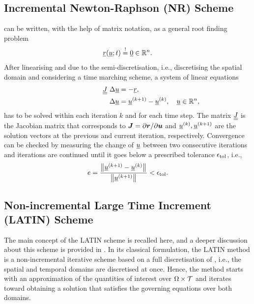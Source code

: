 \subsection{Incremental Newton-Raphson (NR) Scheme}
 can be written, with the help of matrix notation, as a general root finding problem \parencite{de2011computational}
\begin{equation}
	\vr(\vu;t) \shouldEq \vzero \in \ffR^n.
	\label{eq_residual_nr}
\end{equation}
After linearising  and due to the semi-discretisation, i.e., discretising the spatial domain and considering a time marching scheme, a system of linear equations
\begin{equation}
	\begin{split}
		\hspace{2.4cm}
		\underline{\underline{J}} \ \Delta\underline{u} &= - \underline{r},\\
		\Delta\underline{u} &= \underline{u}^{(k+1)} - \underline{u}^{(k)}, \quad \underline{u} \in {\mathbb{ R}}^n,
	\end{split}
	\label{eq:NR_full}
\end{equation}
has to be solved within each iteration $k$ and for each time step. The matrix $\underline{\underline{J}}$ is the Jacobian matrix that corresponds to $\mbox{$\bm  J$}=\partial\mbox{$\bm  r$} / \partial \mbox{$\bm  u$}$ and $\underline{u}^{(k)}, \underline{u}^{(k+1)}$ are the solution vectors at the previous and current iteration, respectively. Convergence can be checked by measuring the change of $\underline{u}$ between two consecutive iterations and iterations are continued until it goes below a prescribed tolerance $\epsilon_{\rm tol}$, i.e.,
\begin{equation}
	e = \frac{\left\lVert \underline{u}^{(k+1)} - \underline{u}^{(k)} \right\rVert_{}^{}}{\left\lVert \underline{u}^{(k+1)} \right\rVert_{}^{}} < \epsilon_{\rm tol}.
\end{equation}

\subsection{Non-incremental Large Time Increment (LATIN) Scheme}
The main concept of the LATIN scheme \parencite{lad1999} is recalled here, and a deeper discussion about this scheme is provided in . In its classical formulation, the LATIN method is a non-incremental iterative scheme based on a full discretisation of , i.e., the spatial and temporal domains are discretised at once. Hence, the method starts with an approximation of the quantities of interest over $\Omega \times {\cal T}$ and iterates toward obtaining a solution that satisfies the governing equations over both domains.

